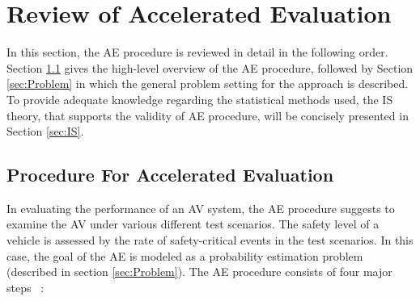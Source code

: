 \documentclass[letterpaper, 10 pt, journal]{IEEEtran}  %
\newcommand{\mansur}[1]{\textcolor{blue}{[Mansur: #1]}}
\begin{document}

\section{Review of Accelerated Evaluation} \label{sec:AE}

In this section, the AE procedure is reviewed in detail in the following order. Section \ref{sec:AE_procedure} gives the high-level overview of the AE procedure, followed by Section \ref{sec:Problem} in which the general problem setting for the approach is described. To provide adequate knowledge regarding the statistical methods used, the IS theory, that supports the validity of AE procedure, will be concisely presented in Section \ref{sec:IS}.


\subsection{Procedure For Accelerated Evaluation}\label{sec:AE_procedure}

In evaluating the performance of an AV system, the AE procedure suggests to examine the AV under various different test scenarios. The safety level of a vehicle is assessed by the rate of safety-critical events in the test scenarios. In this case, the goal of the AE is modeled as a probability estimation problem (described in section \ref{sec:Problem}). The AE procedure consists of four major steps ~\cite{huang2017accelerated}:
\end{document}
